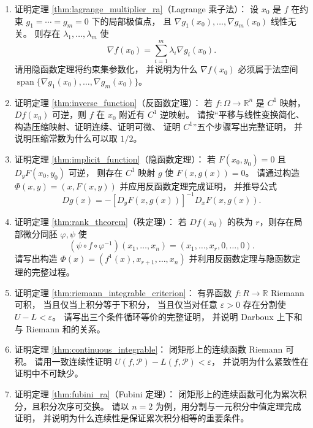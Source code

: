 \begin{enumerate}[leftmargin=3em, label=\textbf{题 \arabic*}]
    \item 证明定理 \ref{thm:lagrange_multiplier_ra}（Lagrange 乘子法）：
    设 $x_0$ 是 $f$ 在约束 $g_1=\cdots=g_m=0$ 下的局部极值点，
    且 $\nabla g_1(x_0),\dots,\nabla g_m(x_0)$ 线性无关。
    则存在 $\lambda_1,\dots,\lambda_m$ 使
    \[
    \nabla f(x_0)=\sum_{i=1}^m\lambda_i\nabla g_i(x_0).
    \]
    请用隐函数定理将约束集参数化，
    并说明为什么 $\nabla f(x_0)$ 必须属于法空间
    $\operatorname{span}\{\nabla g_1(x_0),\dots,\nabla g_m(x_0)\}$。

    \item 证明定理 \ref{thm:inverse_function}（反函数定理）：
    若 $f:\Omega\to\mathbb{R}^n$ 是 $C^1$ 映射，
    $Df(x_0)$ 可逆，则 $f$ 在 $x_0$ 附近有 $C^1$ 逆映射。
    请按“平移与线性变换简化、构造压缩映射、证明连续、证明可微、
    证明 $C^1$”五个步骤写出完整证明，
    并说明压缩常数为什么可以取 $1/2$。

    \item 证明定理 \ref{thm:implicit_function}（隐函数定理）：
    若 $F(x_0,y_0)=0$ 且 $D_yF(x_0,y_0)$ 可逆，
    则存在 $C^1$ 映射 $g$ 使 $F(x,g(x))=0$。
    请通过构造 $\Phi(x,y)=(x,F(x,y))$ 并应用反函数定理完成证明，
    并推导公式
    \[
    Dg(x)=-[D_yF(x,g(x))]^{-1}D_xF(x,g(x)).
    \]

    \item 证明定理 \ref{thm:rank_theorem}（秩定理）：
    若 $Df(x_0)$ 的秩为 $r$，则存在局部微分同胚 $\varphi,\psi$ 使
    \[
    (\psi\circ f\circ\varphi^{-1})(x_1,\dots,x_n)
    =(x_1,\dots,x_r,0,\dots,0).
    \]
    请写出构造 $\Phi(x)=(f^1(x),x_{r+1},\dots,x_n)$
    并利用反函数定理与隐函数定理的完整过程。

    \item 证明定理 \ref{thm:riemann_integrable_criterion}：
    有界函数 $f:R\to\mathbb{R}$ Riemann 可积，
    当且仅当上积分等于下积分，
    当且仅当对任意 $\varepsilon>0$ 存在分割使 $U-L<\varepsilon$。
    请写出三个条件循环等价的完整证明，
    并说明 Darboux 上下和与 Riemann 和的关系。

    \item 证明定理 \ref{thm:continuous_integrable}：
    闭矩形上的连续函数 Riemann 可积。
    请用一致连续性证明 $U(f,\mathcal{P})-L(f,\mathcal{P})<\varepsilon$，
    并说明为什么紧致性在证明中不可缺少。

    \item 证明定理 \ref{thm:fubini_ra}（Fubini 定理）：
    闭矩形上的连续函数可化为累次积分，且积分次序可交换。
    请以 $n=2$ 为例，用分割与一元积分中值定理完成证明，
    并说明为什么连续性是保证累次积分相等的重要条件。


\end{enumerate}
